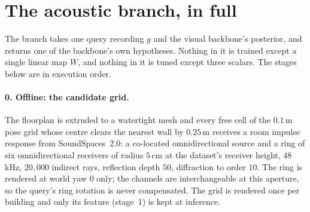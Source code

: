 
\section{The acoustic branch, in full}
\label{sec:audio-branch}

The branch takes one query recording $g$ and the visual backbone's posterior,
and returns one of the backbone's own hypotheses. Nothing in it is trained
except a single linear map $W$, and nothing in it is tuned except three
scalars. The stages below are in execution order.

\paragraph{0. Offline: the candidate grid.}
The floorplan is extruded to a watertight mesh and every free cell of the
$0.1$\,m pose grid whose centre clears the nearest wall by $0.25$\,m receives a
room impulse response from SoundSpaces~2.0: a co-located omnidirectional source
and a ring of six omnidirectional receivers of radius $5$\,cm at the dataset's
receiver height, $48$\,kHz, $20{,}000$ indirect rays, reflection depth $50$,
diffraction to order $10$. The ring is rendered at world yaw $0$ only; the
channels are interchangeable at this aperture, so the query's ring rotation is
never compensated. The grid is rendered once per building and only its feature
(stage~1) is kept at inference.

